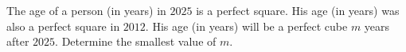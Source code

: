 The age of a person (in years) in $2025$ is a perfect square. His age (in years) was also a perfect square in $2012$. His age (in years) will be a perfect cube $m$ years after $2025$. Determine the smallest value of $m$.
